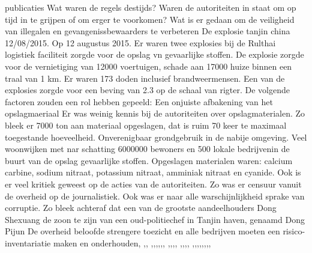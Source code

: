 publicaties
\cite{heuvelkroesschipholbrandcamerabeelden}
Wat waren de regels destijds?
Waren de autoriteiten in staat om op tijd in te grijpen of om erger te voorkomen?
Wat is er gedaan om de veiligheid van illegalen en gevangenissbewaarders te verbeteren
\newline \indent De explosie tanjin china 12/08/2015. 
Op 12 augustus 2015. Er waren twee explosies bij de Rulthai logistiek  faciliteit zorgde voor de opslag vn  gevaarlijke stoffen. De explosie zorgde voor de vernietiging van 12000 voertuigen, schade aan 17000 huize binnen een traal van 1 km. Er waren 173 doden inclusief brandweermensen.
Een van de explosies zorgde voor  een beving van 2.3 op de schaal van rigter.
De volgende factoren zouden een rol hebben gepeeld:
Een onjuiste afbakening van het opslagmaeriaal
Er was  weinig kennis bij de autoriteiten over  opslagmaterialen. Zo bleek er 7000 ton aan materiaal opgeslagen, dat is ruim 70 keer te maximaal toegestande hoeveelheid. 
Onverenigbaar grondgebruik in de nabije omgeving. Veel woonwijken met nar schatting 6000000 bewoners en 500 lokale bedrijvenin de buurt van de opslag gevaarlijke stoffen.
Opgeslagen materialen  waren: calcium carbine, sodium nitraat, potassium nitraat, amminiak nitraat en cyanide.
Ook is er veel kritiek geweest op de acties van de autoriteiten. Zo was er censuur vanuit de overheid op de journalistiek.
Ook was er naar alle warschijnlijkheid sprake van corruptie. Zo bleek achteraf dat een van de grootste aandeelhouders Dong Shexuang de zoon te zijn van een oud-politiechef in Tanjin haven, genaamd Dong Pijun
De overheid beloofde strengere toezicht en alle bedrijven moeten een risico-inventariatie maken en onderhouden\cite{jiang16042019TanjinExplosion},
\cite{staff31082015tanjinblastunrevealed},\cite{chinafile18082015tanjinexplosion},
\cite{pinghuang2410201TanjinFactreport},\cite{portoTanjinExplosionSight},\cite{imago17082015TanjinApartmentImages},\cite{trager14082015Chemicalblast},\cite{pangeramo27082015TanjinExplosion},\cite{ap06082020ammaniumnitrate},
\cite{morris14082015TanjinIndustryImpact},\cite{milesyu20082015exposingtoxicgovlines},\cite{artemis30032016tanjininsurance},\cite{aidenxiatanjinblast},
\cite{danwangTanjinflexreport},\cite{keyHighlightsTanjin},\cite{hartley13082015videofootage},\cite{odonnel01062017firetanjinblast2015},
\cite{fan15082015newyorkermistrustchina},\cite{yanlidongchinamediaframingTanjin},\cite{evans27092017TnjinInsurance},\cite{jasi26032019chineschemplant},\cite{shiqingTanjinExecutiveSentence},\cite{sophiebeach15082015},\cite{hamzeh05082020BeirutBlast},\cite{chemwatch18082015TanjiinExplosion},
